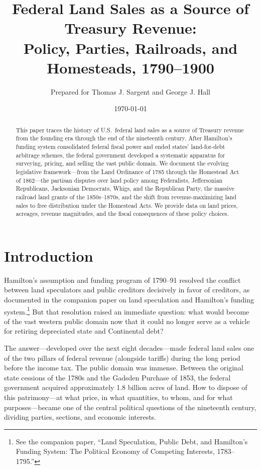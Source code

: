 \documentclass[12pt]{article}
\title{Federal Land Sales as a Source of Treasury Revenue:\\
Policy, Parties, Railroads, and Homesteads, 1790--1900}
\author{Prepared for Thomas J. Sargent and George J. Hall}
\date{\today}
\begin{document}
\maketitle

\begin{abstract}
This paper traces the history of U.S.\ federal land sales as a source of Treasury revenue from the founding era through the end of the nineteenth century.  After Hamilton's funding system consolidated federal fiscal power and ended states' land-for-debt arbitrage schemes, the federal government developed a systematic apparatus for surveying, pricing, and selling the vast public domain.  We document the evolving legislative framework---from the Land Ordinance of 1785 through the Homestead Act of 1862---the partisan disputes over land policy among Federalists, Jeffersonian Republicans, Jacksonian Democrats, Whigs, and the Republican Party, the massive railroad land grants of the 1850s--1870s, and the shift from revenue-maximizing land sales to free distribution under the Homestead Acts.  We provide data on land prices, acreages, revenue magnitudes, and the fiscal consequences of these policy choices.
\end{abstract}

\section{Introduction}

Hamilton's assumption and funding program of 1790--91 resolved the conflict between land speculators and public creditors decisively in favor of creditors, as documented in the companion paper on land speculation and Hamilton's funding system.\footnote{See the companion paper, ``Land Speculation, Public Debt, and Hamilton's Funding System: The Political Economy of Competing Interests, 1783--1795.''}  But that resolution raised an immediate question: what would become of the vast western public domain now that it could no longer serve as a vehicle for retiring depreciated state and Continental debt?

The answer---developed over the next eight decades---made federal land sales one of the two pillars of federal revenue (alongside tariffs) during the long period before the income tax.  The public domain was immense.  Between the original state cessions of the 1780s and the Gadsden Purchase of 1853, the federal government acquired approximately 1.8 billion acres of land.  How to dispose of this patrimony---at what price, in what quantities, to whom, and for what purposes---became one of the central political questions of the nineteenth century, dividing parties, sections, and economic interests.
\end{document}
